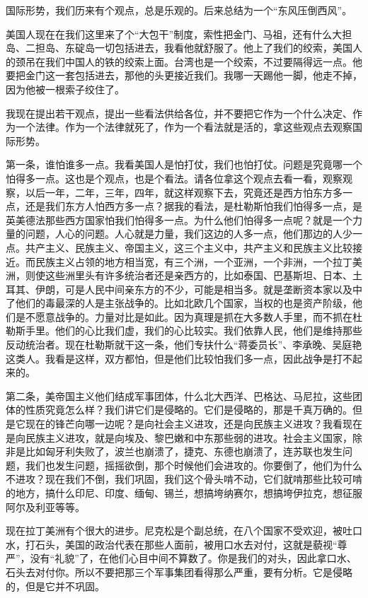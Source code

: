 国际形势，我们历来有个观点，总是乐观的。后来总结为一个“东风压倒西风”。

美国人现在在我们这里来了个“大包干”制度，索性把金门、马祖，还有什么大担岛、二担岛、东碇岛一切包括进去，我看他就舒服了。他上了我们的绞索，美国人的颈吊在我们中国人的铁的绞索上面。台湾也是一个绞索，不过要隔得远一点。他要把金门这一套包括进去，那他的头更接近我们。我哪一天踢他一脚，他走不掉，因为他被一根索子绞住了。

我现在提出若干观点，提出一些看法供给各位，并不要把它作为一个什么决定、作为一个法律。作为一个法律就死了，作为一个看法就是活的，拿这些观点去观察国际形势。

第一条，谁怕谁多一点。我看美国人是怕打仗，我们也怕打仗。问题是究竟哪一个怕得多一点。这也是个观点，也是个看法。请各位拿这个观点去看一看，观察观察，以后一年，二年，三年，四年，就这样观察下去，究竟还是西方怕东方多一点，还是我们东方人怕西方多一点？据我的看法，是杜勒斯怕我们怕得多一点，是英美德法那些西方国家怕我们怕得多一点。为什么他们怕得多一点呢？就是一个力量的问题，人心的问题。人心就是力量，我们这边的人多一点，他们那边的人少一点。共产主义、民族主义、帝国主义，这三个主义中，共产主义和民族主义比较接近。而民族主义占领的地方相当宽，有三个洲，一个亚洲，一个非洲，一个拉丁美洲，则使这些洲里头有许多统治者还是亲西方的，比如泰国、巴基斯坦、日本、土耳其、伊朗，可是人民中间亲东方的不少，可能是相当多。就是垄断资本家以及中了他们的毒最深的人是主张战争的。比如北欧几个国家，当权的也是资产阶级，他们是不愿意战争的。力量对比是如此。因为真理是抓在大多数人手里，而不抓在杜勒斯手里。他们的心比我们虚，我们的心比较实。我们依靠人民，他们是维持那些反动统治者。现在杜勒斯就干这一条，他们专扶什么“蒋委员长”、李承晚、吴庭艳这类人。我看是这样，双方都怕，但是他们比较怕我们多一点，因此战争是打不起来的。

第二条，美帝国主义他们结成军事团体，什么北大西洋、巴格达、马尼拉，这些团体的性质究竟怎么样？我们讲它们是侵略的。它们是侵略的，那是千真万确的。但是它现在的锋芒向哪一边呢？是向社会主义进攻，还是向民族主义进攻？我看现在是向民族主义进攻，就是向埃及、黎巴嫩和中东那些弱的进攻。社会主义国家，除非是比如匈牙利失败了，波兰也崩溃了，捷克、东德也崩溃了，连苏联也发生问题，我们也发生问题，摇摇欲倒，那个时候他们会进攻的。你要倒了，他们为什么不进攻？现在我们不倒，我们巩固，我们这个骨头啃不动，它们就啃那些比较可啃的地方，搞什么印尼、印度、缅甸、锡兰，想搞垮纳赛尔，想搞垮伊拉克，想征服阿尔及利亚等等。

现在拉丁美洲有个很大的进步。尼克松是个副总统，在八个国家不受欢迎，被吐口水，打石头，美国的政治代表在那些人面前，被用口水去对付，这就是藐视“尊严”，没有“礼貌”了，在他们心目中间不算数了。你是我们的对头，因此拿口水、石头去对付你。所以不要把那三个军事集团看得那么严重，要有分析。它是侵略的，但是它并不巩固。

